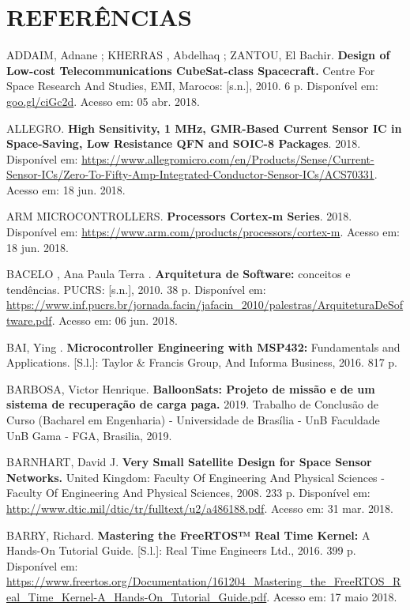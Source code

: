 \chapter[REFERÊNCIAS]{REFERÊNCIAS}

\noindent ADDAIM, Adnane ; KHERRAS , Abdelhaq ; ZANTOU, El Bachir. \textbf{Design of Low-cost Telecommunications CubeSat-class Spacecraft. } Centre For Space Research And Studies, EMI, Marocos: [s.n.], 2010. 6 p. Disponível em: \url{goo.gl/ciGc2d}. Acesso em: 05 abr. 2018.

\noindent ALLEGRO. \textbf{High Sensitivity, 1 MHz, GMR-Based Current Sensor IC  in Space-Saving, Low Resistance QFN and SOIC-8 Packages}. 2018. Disponível em: \url{https://www.allegromicro.com/en/Products/Sense/Current-Sensor-ICs/Zero-To-Fifty-Amp-Integrated-Conductor-Sensor-ICs/ACS70331}. Acesso em: 18 jun. 2018.

\noindent ARM MICROCONTROLLERS. \textbf{Processors Cortex-m Series}. 2018. Disponível em: \url{https://www.arm.com/products/processors/cortex-m}. Acesso em: 18 jun. 2018.

\noindent BACELO , Ana Paula Terra . \textbf{Arquitetura de Software:} conceitos e tendências. PUCRS: [s.n.], 2010. 38 p. Disponível em: \url{https://www.inf.pucrs.br/jornada.facin/jafacin_2010/palestras/ArquiteturaDeSoftware.pdf}. Acesso em: 06 jun. 2018.

\noindent BAI, Ying . \textbf{Microcontroller Engineering with MSP432:} Fundamentals and Applications. [S.l.]: Taylor \& Francis Group, And Informa Business, 2016. 817 p.

\noindent BARBOSA, Victor Henrique. \textbf{BalloonSats: Projeto de missão e de um sistema de recuperação de carga paga.} 2019. Trabalho de Conclusão de Curso (Bacharel em Engenharia) - Universidade de Brasília - UnB Faculdade UnB Gama - FGA, Brasilia, 2019.

\noindent BARNHART, David J. \textbf{Very Small Satellite Design for Space Sensor Networks. } United Kingdom: Faculty Of Engineering And Physical Sciences - Faculty Of Engineering And Physical Sciences, 2008. 233 p. Disponível em: \url{http://www.dtic.mil/dtic/tr/fulltext/u2/a486188.pdf}. Acesso em: 31 mar. 2018.

\noindent BARRY, Richard. \textbf{Mastering the FreeRTOS™ Real Time Kernel:} A Hands-On Tutorial Guide. [S.l.]: Real Time Engineers Ltd., 2016. 399 p. Disponível em: \url{https://www.freertos.org/Documentation/161204_Mastering_the_FreeRTOS_Real_Time_Kernel-A_Hands-On_Tutorial_Guide.pdf}. Acesso em: 17 maio 2018.

